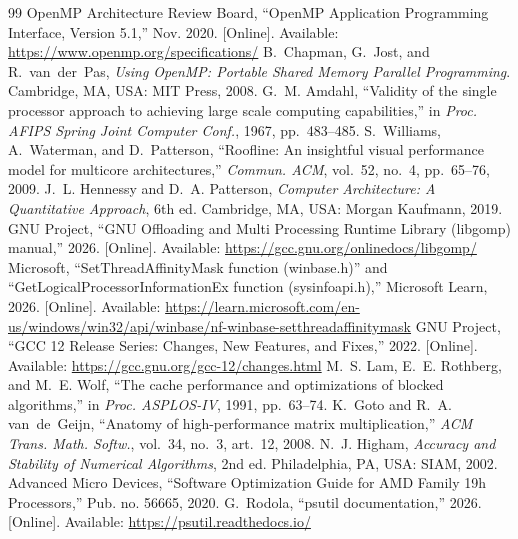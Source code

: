 \documentclass[11pt,a4paper]{article}
\begin{document}
\begin{thebibliography}{99}\small\sloppy
\setlength{\itemsep}{1pt}
 OpenMP Architecture Review Board, ``OpenMP Application Programming Interface, Version 5.1,'' Nov. 2020. [Online]. Available: \url{https://www.openmp.org/specifications/}
 B.~Chapman, G.~Jost, and R.~van~der~Pas, \emph{Using OpenMP: Portable Shared Memory Parallel Programming}. Cambridge, MA, USA: MIT Press, 2008.
 G.~M. Amdahl, ``Validity of the single processor approach to achieving large scale computing capabilities,'' in \emph{Proc. AFIPS Spring Joint Computer Conf.}, 1967, pp.~483--485.
 S.~Williams, A.~Waterman, and D.~Patterson, ``Roofline: An insightful visual performance model for multicore architectures,'' \emph{Commun. ACM}, vol.~52, no.~4, pp.~65--76, 2009.
 J.~L. Hennessy and D.~A. Patterson, \emph{Computer Architecture: A Quantitative Approach}, 6th ed. Cambridge, MA, USA: Morgan Kaufmann, 2019.
 GNU Project, ``GNU Offloading and Multi Processing Runtime Library (libgomp) manual,'' 2026. [Online]. Available: \url{https://gcc.gnu.org/onlinedocs/libgomp/}
 Microsoft, ``SetThreadAffinityMask function (winbase.h)'' and ``GetLogicalProcessorInformationEx function (sysinfoapi.h),'' Microsoft Learn, 2026. [Online]. Available: \url{https://learn.microsoft.com/en-us/windows/win32/api/winbase/nf-winbase-setthreadaffinitymask}
 GNU Project, ``GCC 12 Release Series: Changes, New Features, and Fixes,'' 2022. [Online]. Available: \url{https://gcc.gnu.org/gcc-12/changes.html}
 M.~S. Lam, E.~E. Rothberg, and M.~E. Wolf, ``The cache performance and optimizations of blocked algorithms,'' in \emph{Proc. ASPLOS-IV}, 1991, pp.~63--74.
 K.~Goto and R.~A. van~de~Geijn, ``Anatomy of high-performance matrix multiplication,'' \emph{ACM Trans. Math. Softw.}, vol.~34, no.~3, art.~12, 2008.
 N.~J. Higham, \emph{Accuracy and Stability of Numerical Algorithms}, 2nd ed. Philadelphia, PA, USA: SIAM, 2002.
 Advanced Micro Devices, ``Software Optimization Guide for AMD Family 19h Processors,'' Pub. no. 56665, 2020.
 G.~Rodola, ``psutil documentation,'' 2026. [Online]. Available: \url{https://psutil.readthedocs.io/}
\end{thebibliography}

\clearpage
\appendix
\end{document}
